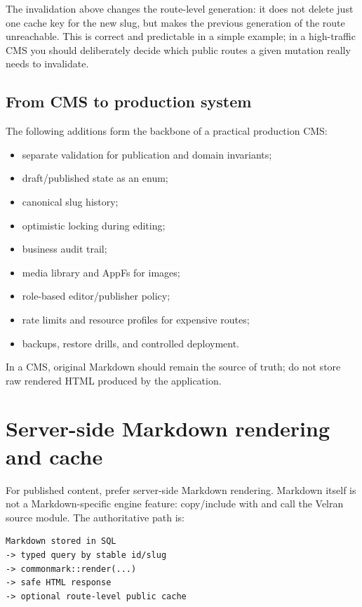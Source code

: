 The invalidation above changes the route-level generation: it does not delete just one cache key for the new slug, but makes the previous generation of the  route unreachable. This is correct and predictable in a simple example; in a high-traffic CMS you should deliberately decide which public routes a given mutation really needs to invalidate.

\subsection*{From CMS to production system}

The following additions form the backbone of a practical production CMS:

\begin{itemize}
  \item separate validation for publication and domain invariants;
  \item draft/published state as an enum;
  \item canonical slug history;
  \item optimistic locking during editing;
  \item business audit trail;
  \item media library and AppFs for images;
  \item role-based editor/publisher policy;
  \item rate limits and resource profiles for expensive routes;
  \item backups, restore drills, and controlled deployment.
\end{itemize}

In a CMS, original Markdown should remain the source of truth; do not store raw rendered HTML produced by the application.


\section{Server-side Markdown rendering and cache}

For published content, prefer server-side Markdown rendering. Markdown itself is not a Markdown-specific engine feature: copy/include  with  and call the Velran source module. The authoritative path is:

\begin{lstlisting}
Markdown stored in SQL
-> typed query by stable id/slug
-> commonmark::render(...)
-> safe HTML response
-> optional route-level public cache
\end{lstlisting}

